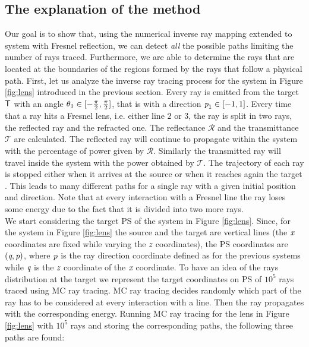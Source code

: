 \subsection{The explanation of the method}
Our goal is to show that, using the numerical inverse ray mapping extended to system with Fresnel reflection, we can detect \textit{all} the possible paths limiting the number of rays traced. Furthermore, we are able to determine the rays that are located at the boundaries of the regions formed by the rays that follow a physical path.
First, let us analyze the inverse ray tracing process for the system in Figure \ref{fig:lens} introduced in the previous section. Every ray is emitted from the target $\textsf{T}$ with an angle $\theta_1\in[-\frac{\pi}{2}, \frac{\pi}{2}]$, that is with a direction $\textit{p}_1\in[-1,1]$. Every time that a ray hits a Fresnel lens, i.e. either line $2$ or $3$, the ray is split in two rays, the reflected ray and the refracted one. The reflectance $\mathcal{R}$ and the transmittance $\mathcal{T}$ are calculated. The reflected ray will continue to propagate within the system with the percentage of power given by $\mathcal{R}$. Similarly the transmitted ray will travel inside the system with the power obtained by $\mathcal{T}$. The trajectory of each ray is stopped either when it arrives at the source  or when it reaches again the target . This leads to many different paths for a single ray with a given initial position and direction. Note that at every interaction with a Fresnel line the ray loses some energy due to the fact that it is divided into two more rays.
\\ \indent
We start considering the target PS of the system in Figure \ref{fig:lens}. Since, for the system in Figure \ref{fig:lens} the source and the target are vertical lines (the $\textit{x}$ coordinates are fixed while varying the $\textit{z}$ coordinates), the PS coordinates are $(\textit{q}, \textit{p})$, where  $\textit{p}$ is the ray direction coordinate defined as for the previous systems while $\textit{q}$ is the $\textit{z}$ coordinate of the $\textit{x}$ coordinate. To have an idea of the rays distribution at the target we represent the target coordinates on PS of $10^5$ rays traced using MC ray tracing. MC ray tracing decides randomly which part of the ray has to be considered at every interaction with a line. Then the ray propagates with the corresponding energy. Running MC ray tracing for the lens in Figure \ref{fig:lens} with $10^5$ rays and storing the corresponding paths, the following three paths are found:
